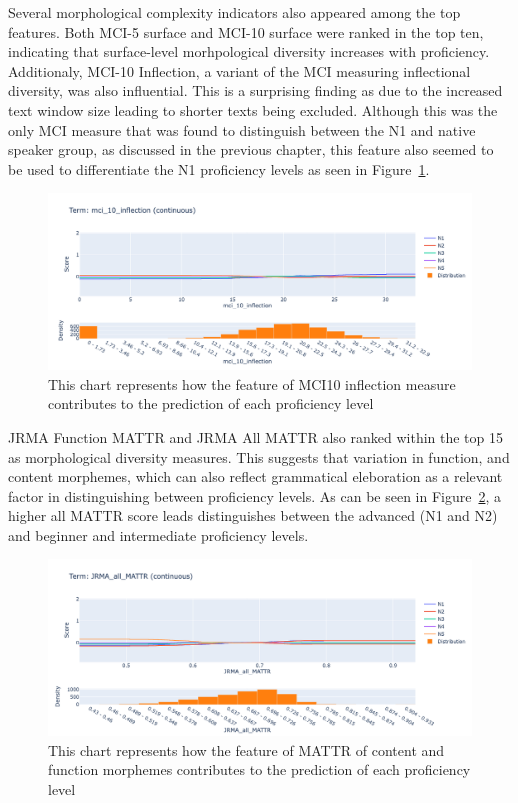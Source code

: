 Several morphological complexity indicators also appeared among the top features. Both MCI-5 surface and MCI-10
surface were ranked in the top ten, indicating that surface-level morhpological diversity increases with
proficiency. Additionaly, MCI-10 Inflection, a variant of the MCI measuring inflectional diversity, was also
influential. This is a surprising finding as due to the increased text window size leading to shorter texts being
 excluded. Although this was the only MCI measure that was found to distinguish between the N1 and native speaker
group, as discussed in the previous chapter, this feature also seemed to be used to differentiate the N1 proficiency
levels as seen in Figure~\ref{fig:EBMMCI10inflection}.

\begin{figure}[h!]
    \centering
    \includegraphics[scale=.4]{img/EBM/MCI10inflection}
    \caption[Contribution of MCI 10 Inflection measure]{This chart represents how the feature of MCI10 inflection measure contributes to the prediction of each proficiency level}
    \label{fig:EBMMCI10inflection}
\end{figure}

JRMA Function MATTR and JRMA All MATTR also ranked within the top 15 as morphological diversity measures. This
suggests that variation in function, and content morphemes, which can also reflect grammatical eleboration as a
relevant factor in distinguishing between proficiency levels. As can be seen in Figure~\ref{fig:JRMAallMATTR}, a higher
all MATTR
score leads distinguishes between the advanced (N1 and N2) and beginner and intermediate proficiency levels.

\begin{figure}[h!]
    \centering
    \includegraphics[scale=.4]{img/EBM/JRMAallMATTR}
    \caption[Contribution of JRMA function and content morphemes]{This chart represents how the feature of MATTR of content and function morphemes contributes to the prediction of each proficiency level}
    \label{fig:JRMAallMATTR}
\end{figure}

